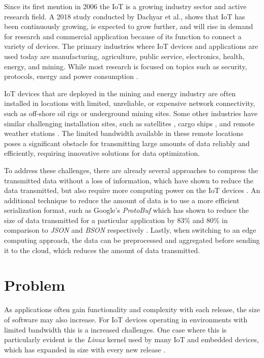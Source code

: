 Since its first mention in 2006 \cite{Adelmann2006ToolkitFB} the \ac{IoT}
is a growing industry sector and active research field. A 2018 study conducted
by Dachyar et al., shows that \ac{IoT} has been continuously growing, is expected
to grow further, and will rise in demand for research and commercial application
because of its function to connect a variety of devices. The primary industries
where \ac{IoT} devices and applications are used today are manufacturing,
agriculture, public service, electronics, health, energy, and mining.
While most research is focused on topics such as security, protocols, energy and
power consumption \cite{dachyar2019knowledge}.

\ac{IoT} devices that are deployed in the mining and energy industry are often
installed in locations with limited, unreliable, or expensive network
connectivity, such as off-shore oil rigs or underground mining sites.
Some other industries have similar challenging installation sites, such as
satellites \cite{electronics8111247}, cargo ships \cite{9090272}, and remote weather stations \cite{info12040146}.
The limited bandwidth available in these remote locations poses a significant
obstacle for transmitting large amounts of data reliably and efficiently,
requiring innovative solutions for data optimization.

To address these challenges, there are already several approaches to compress
the transmitted data without a loss of information, which have shown to reduce
the data transmitted, but also require more computing power on the \ac{IoT}
devices \cite{9243457}. An additional technique to reduce the amount of data
is to use a more efficient serialization format, such as Google's \textit{ProtoBuf}
which has shown to reduce the size of data transmitted for a particular application
by 83\% and 80\% in comparison to \textit{JSON} and \textit{BSON} respectively \cite{7765670}.
Lastly, when switching to an edge computing approach, the data can be preprocessed
and aggregated before sending it to the cloud, which reduces the amount of data
transmitted.


\section{Problem}
As applications often gain functionality and complexity with each release, the
size of software may also increase. For \ac{IoT} devices operating in environments
with limited bandwidth this is a increased challenges. One case where this is
particularly evident is the \textit{Linux} kernel used by many \ac{IoT} and embedded
devices, which has expanded in size with every new release \cite{linux-kernel-report}.

